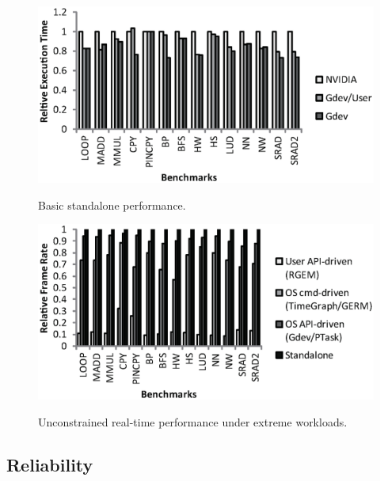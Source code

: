 \begin{figure}[t]
 \begin{center}
  \includegraphics[width=0.9\hsize]{eps/basic_performance.eps}\\
  \vspace{-1.5em}
  \caption{Basic standalone performance.}
  \label{fig:basic_performance}
 \end{center}
 \vspace{-1.5em}
 \begin{center}
  \includegraphics[width=0.9\hsize]{eps/scheduler_overhead.eps}\\
  \vspace{-1.5em}
  \caption{Unconstrained real-time performance under extreme workloads.}
  \label{fig:scheduler_overhead}
 \end{center}
  \vspace{-1.5em}
\end{figure}

\subsection{Reliability}

